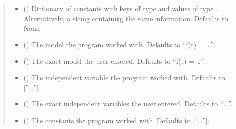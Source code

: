 \documentclass[letterpaper,10pt,english]{sphinxmanual}
\begin{document}
\begin{fulllineitems}
\begin{quote}
\begin{description}
\begin{itemize}
\item {} 
\sphinxAtStartPar
{} (\sphinxstyleliteralemphasis{\sphinxupquote{{[}}}\sphinxstyleliteralemphasis{\sphinxupquote{, }}\sphinxstyleliteralemphasis{\sphinxupquote{{]} }}\sphinxstyleliteralemphasis{\sphinxupquote{| }}\sphinxstyleliteralemphasis{\sphinxupquote{ | }}) \textendash{} Dictionary of constants with keys of type  and values of type .    Alternatively, a string containing the same information. Defaults to None.

\item {} 
\sphinxAtStartPar
{} (\sphinxstyleliteralemphasis{\sphinxupquote{, }}) \textendash{} The model the program worked with. Defaults to “f(t) = …”.

\item {} 
\sphinxAtStartPar
{} (\sphinxstyleliteralemphasis{\sphinxupquote{, }}) \textendash{} The exact model the user entered. Defaults to “f(t) = …”.

\item {} 
\sphinxAtStartPar
{} (\sphinxstyleliteralemphasis{\sphinxupquote{{[}}}\sphinxstyleliteralemphasis{\sphinxupquote{{]}}}\sphinxstyleliteralemphasis{\sphinxupquote{, }}) \textendash{} The independent variable the program worked with. Defaults to {[}”…”{]}.

\item {} 
\sphinxAtStartPar
{} (\sphinxstyleliteralemphasis{\sphinxupquote{, }}) \textendash{} The exact independent variables the user entered. Defaults to “…”.

\item {} 
\sphinxAtStartPar
{} (\sphinxstyleliteralemphasis{\sphinxupquote{{[}}}\sphinxstyleliteralemphasis{\sphinxupquote{{]}}}\sphinxstyleliteralemphasis{\sphinxupquote{, }}) \textendash{} The constants the program worked with. Defaults to {[}”…”{]}.


\end{itemize}
\end{description}
\end{quote}
\end{fulllineitems}
\end{document}
